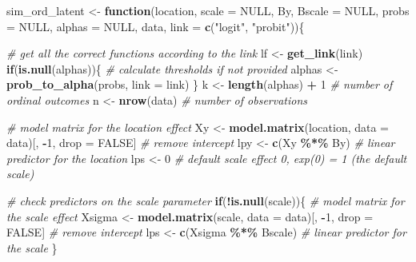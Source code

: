 \documentclass[
  man,floatsintext]{apa6}
\newenvironment{Shaded}{\begin{snugshade}}{\end{snugshade}}
\newcommand{\AttributeTok}[1]{\textcolor[rgb]{0.13,0.29,0.53}{#1}}
\newcommand{\CommentTok}[1]{\textcolor[rgb]{0.56,0.35,0.01}{\textit{#1}}}
\newcommand{\ConstantTok}[1]{\textcolor[rgb]{0.56,0.35,0.01}{#1}}
\newcommand{\ControlFlowTok}[1]{\textcolor[rgb]{0.13,0.29,0.53}{\textbf{#1}}}
\newcommand{\DecValTok}[1]{\textcolor[rgb]{0.00,0.00,0.81}{#1}}
\newcommand{\FunctionTok}[1]{\textcolor[rgb]{0.13,0.29,0.53}{\textbf{#1}}}
\newcommand{\NormalTok}[1]{#1}
\newcommand{\OtherTok}[1]{\textcolor[rgb]{0.56,0.35,0.01}{#1}}
\newcommand{\SpecialCharTok}[1]{\textcolor[rgb]{0.81,0.36,0.00}{\textbf{#1}}}
\newcommand{\StringTok}[1]{\textcolor[rgb]{0.31,0.60,0.02}{#1}}
\begin{document}
\begin{Shaded}
\begin{Highlighting}[]
\NormalTok{sim\_ord\_latent }\OtherTok{\textless{}{-}} \ControlFlowTok{function}\NormalTok{(location,}
                           \AttributeTok{scale =} \ConstantTok{NULL}\NormalTok{,}
\NormalTok{                           By,}
                           \AttributeTok{Bscale =} \ConstantTok{NULL}\NormalTok{,}
                           \AttributeTok{probs =} \ConstantTok{NULL}\NormalTok{, }
                           \AttributeTok{alphas =} \ConstantTok{NULL}\NormalTok{, }
\NormalTok{                           data, }
                           \AttributeTok{link =} \FunctionTok{c}\NormalTok{(}\StringTok{"logit"}\NormalTok{, }\StringTok{"probit"}\NormalTok{))\{}
  
  \CommentTok{\# get all the correct functions according to the link}
\NormalTok{  lf }\OtherTok{\textless{}{-}} \FunctionTok{get\_link}\NormalTok{(link)}
  \ControlFlowTok{if}\NormalTok{(}\FunctionTok{is.null}\NormalTok{(alphas))\{}
    \CommentTok{\# calculate thresholds if not provided}
\NormalTok{    alphas }\OtherTok{\textless{}{-}} \FunctionTok{prob\_to\_alpha}\NormalTok{(probs, }\AttributeTok{link =}\NormalTok{ link)}
\NormalTok{  \}}
\NormalTok{  k }\OtherTok{\textless{}{-}} \FunctionTok{length}\NormalTok{(alphas) }\SpecialCharTok{+} \DecValTok{1} \CommentTok{\# number of ordinal outcomes}
\NormalTok{  n }\OtherTok{\textless{}{-}} \FunctionTok{nrow}\NormalTok{(data) }\CommentTok{\# number of observations}
  
  \CommentTok{\# model matrix for the location effect}
\NormalTok{  Xy }\OtherTok{\textless{}{-}} \FunctionTok{model.matrix}\NormalTok{(location, }\AttributeTok{data =}\NormalTok{ data)[, }\SpecialCharTok{{-}}\DecValTok{1}\NormalTok{, drop }\OtherTok{=} \ConstantTok{FALSE}\NormalTok{] }\CommentTok{\# remove intercept}
\NormalTok{  lpy }\OtherTok{\textless{}{-}} \FunctionTok{c}\NormalTok{(Xy }\SpecialCharTok{\%*\%}\NormalTok{ By) }\CommentTok{\# linear predictor for the location}
\NormalTok{  lps }\OtherTok{\textless{}{-}} \DecValTok{0} \CommentTok{\# default scale effect 0, exp(0) = 1 (the default scale)}
  
  \CommentTok{\# check predictors on the scale parameter}
  \ControlFlowTok{if}\NormalTok{(}\SpecialCharTok{!}\FunctionTok{is.null}\NormalTok{(scale))\{}
    \CommentTok{\# model matrix for the scale effect}
\NormalTok{    Xsigma }\OtherTok{\textless{}{-}} \FunctionTok{model.matrix}\NormalTok{(scale, }\AttributeTok{data =}\NormalTok{ data)[, }\SpecialCharTok{{-}}\DecValTok{1}\NormalTok{, drop }\OtherTok{=} \ConstantTok{FALSE}\NormalTok{] }\CommentTok{\# remove intercept}
\NormalTok{    lps }\OtherTok{\textless{}{-}} \FunctionTok{c}\NormalTok{(Xsigma }\SpecialCharTok{\%*\%}\NormalTok{ Bscale) }\CommentTok{\# linear predictor for the scale}
\NormalTok{  \}}
  

\end{Highlighting}
\end{Shaded}
\end{document}
